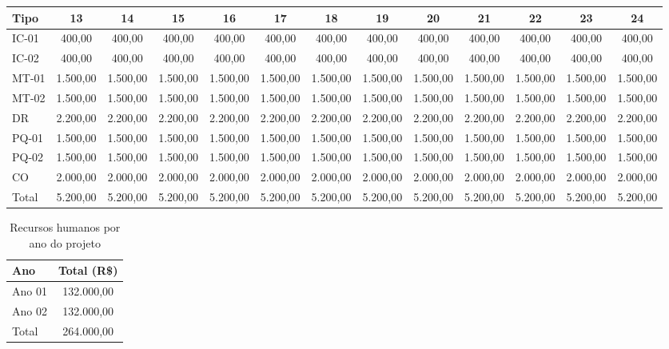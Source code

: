 \begin{table}[!h]
\begin{tabular}{ lcccccccccccc}
\midrule
\midrule
   \rowcolor{lgray}
   Tipo      & 13      & 14      & 15      & 16      & 17      & 18      & 19      & 20      & 21      & 22      & 23      & 24      \\
\midrule
   IC-01     &   400,00&   400,00&   400,00&   400,00&   400,00&   400,00&   400,00&   400,00&   400,00&   400,00&   400,00&   400,00\\
   IC-02     &   400,00&   400,00&   400,00&   400,00&   400,00&   400,00&   400,00&   400,00&   400,00&   400,00&   400,00&   400,00\\
   MT-01     & 1.500,00& 1.500,00& 1.500,00& 1.500,00& 1.500,00& 1.500,00& 1.500,00& 1.500,00& 1.500,00& 1.500,00& 1.500,00& 1.500,00\\
   MT-02     & 1.500,00& 1.500,00& 1.500,00& 1.500,00& 1.500,00& 1.500,00& 1.500,00& 1.500,00& 1.500,00& 1.500,00& 1.500,00& 1.500,00\\
   DR        & 2.200,00& 2.200,00& 2.200,00& 2.200,00& 2.200,00& 2.200,00& 2.200,00& 2.200,00& 2.200,00& 2.200,00& 2.200,00& 2.200,00\\
   PQ-01     & 1.500,00& 1.500,00& 1.500,00& 1.500,00& 1.500,00& 1.500,00& 1.500,00& 1.500,00& 1.500,00& 1.500,00& 1.500,00& 1.500,00\\
   PQ-02     & 1.500,00& 1.500,00& 1.500,00& 1.500,00& 1.500,00& 1.500,00& 1.500,00& 1.500,00& 1.500,00& 1.500,00& 1.500,00& 1.500,00\\
   CO        & 2.000,00& 2.000,00& 2.000,00& 2.000,00& 2.000,00& 2.000,00& 2.000,00& 2.000,00& 2.000,00& 2.000,00& 2.000,00& 2.000,00\\
	\midrule
   Total     & 5.200,00& 5.200,00& 5.200,00& 5.200,00& 5.200,00& 5.200,00& 5.200,00& 5.200,00& 5.200,00& 5.200,00& 5.200,00& 5.200,00\\
\bottomrule
\end{tabular}
	\label{tab:rhmes}
\end{table}
\begin{table}[!h]
\centering
	\caption{Recursos humanos por ano do projeto}
\begin{tabular}{ lc}
\toprule
   Ano       & Total (R\$)  \\
\midrule
   Ano 01    &   132.000,00 \\
   Ano 02    &   132.000,00 \\
\midrule
   Total     &   264.000,00 \\
\bottomrule
\end{tabular}
	\label{tab:rhano}
\end{table}

